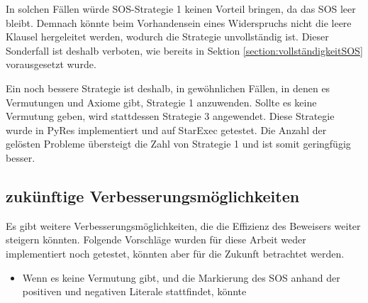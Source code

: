 	In solchen Fällen würde SOS-Strategie 1 keinen Vorteil bringen, da das SOS leer bleibt. Demnach könnte beim Vorhandensein eines Widerspruchs nicht die leere Klausel hergeleitet werden, wodurch die Strategie unvollständig ist. Dieser Sonderfall ist deshalb verboten, wie bereits in Sektion \ref{section:vollständigkeitSOS} vorausgesetzt wurde.
	
	Ein noch bessere Strategie ist deshalb, in gewöhnlichen Fällen, in denen es Vermutungen und Axiome gibt, Strategie 1 anzuwenden. Sollte es keine Vermutung geben, wird stattdessen Strategie 3 angewendet. Diese Strategie wurde in PyRes implementiert und auf StarExec getestet. Die Anzahl der gelösten Probleme übersteigt die Zahl von Strategie 1 und ist somit geringfügig besser.
	
	\subsection{zukünftige Verbesserungsmöglichkeiten}
	Es gibt weitere Verbesserungsmöglichkeiten, die die Effizienz des Beweisers weiter steigern könnten. Folgende Vorschläge wurden für diese Arbeit weder implementiert noch getestet, könnten aber für die Zukunft betrachtet werden.
	\begin{itemize}
		\item Wenn es keine Vermutung gibt, und die Markierung des SOS anhand der positiven und negativen Literale stattfindet, könnte 
	\end{itemize}

